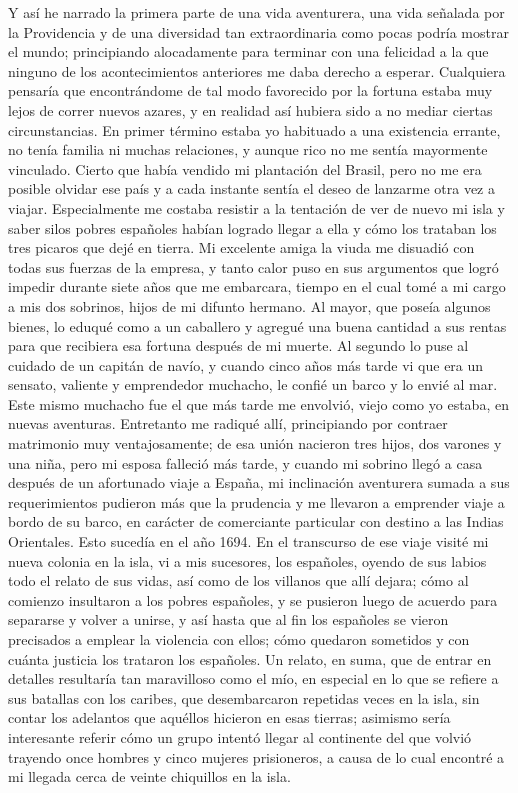 \documentclass{novela}
\begin{document}
    Y así he narrado la primera parte de una vida aventurera, una vida señalada por la Providencia y de una diversidad tan extraordinaria como pocas podría mostrar el mundo; principiando alocadamente para terminar con una felicidad a la que ninguno de los acontecimientos anteriores me daba derecho a esperar.
    Cualquiera pensaría que encontrándome de tal modo favorecido por la fortuna estaba muy lejos de correr nuevos azares, y en realidad así hubiera sido a no mediar ciertas circunstancias. En primer término estaba yo habituado a una existencia errante, no tenía familia ni muchas relaciones, y aunque rico no me sentía mayormente vinculado. Cierto que había vendido mi plantación del Brasil, pero no me era posible olvidar ese país y a cada instante sentía el deseo de lanzarme otra vez a viajar. Especialmente me costaba resistir a la tentación de ver de nuevo mi isla y saber silos pobres españoles habían logrado llegar a ella y cómo los trataban los tres picaros que dejé en tierra.
    Mi excelente amiga la viuda me disuadió con todas sus fuerzas de la empresa, y tanto calor puso en sus argumentos que logró impedir durante siete años que me embarcara, tiempo en el cual tomé a mi cargo a mis dos sobrinos, hijos de mi difunto hermano. Al mayor, que poseía algunos bienes, lo eduqué como a un caballero y agregué una buena cantidad a sus rentas para que recibiera esa fortuna después de mi muerte. Al segundo lo puse al cuidado de un capitán de navío, y cuando cinco años más tarde vi que era un sensato, valiente y emprendedor muchacho, le confié un barco y lo envié al mar. Este mismo muchacho fue el que más tarde me envolvió, viejo como yo estaba, en nuevas aventuras.
    Entretanto me radiqué allí, principiando por contraer matrimonio muy ventajosamente; de esa unión nacieron tres hijos, dos varones y una niña, pero mi esposa falleció más tarde, y cuando mi sobrino llegó a casa después de un afortunado viaje a España, mi inclinación aventurera sumada a sus requerimientos pudieron más que la prudencia y me llevaron a emprender viaje a bordo de su barco, en carácter de comerciante particular con destino a las Indias Orientales. Esto sucedía en el año 1694.
    En el transcurso de ese viaje visité mi nueva colonia en la isla, vi a mis sucesores, los españoles, oyendo de sus labios todo el relato de sus vidas, así como de los villanos que allí dejara; cómo al comienzo insultaron a los pobres españoles, y se pusieron luego de acuerdo para separarse y volver a unirse, y así hasta que al fin los españoles se vieron precisados a emplear la violencia con ellos; cómo quedaron sometidos y con cuánta justicia los trataron los españoles. Un relato, en suma, que de entrar en detalles resultaría tan maravilloso como el mío, en especial en lo que se refiere a sus batallas con los caribes, que desembarcaron repetidas veces en la isla, sin contar los adelantos que aquéllos hicieron en esas tierras; asimismo sería interesante referir cómo un grupo intentó llegar al continente del que volvió trayendo once hombres y cinco mujeres prisioneros, a causa de lo cual encontré a mi llegada cerca de veinte chiquillos en la isla.
\end{document}
